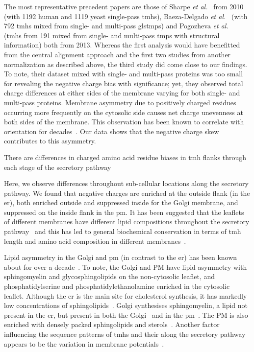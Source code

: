 The most representative precedent papers are those of Sharpe \textit{et al.}~\cite{Sharpe2010} from 2010 (with 1192 human and 1119 yeast single-pass \gls{tmh}s), Baeza-Delgado \textit{et al.}~\cite{Baeza-Delgado2013} (with 792 \gls{tmh}s mixed from single- and multi-pass gls{tmp}s) and Pogozheva \textit{et al.}~\cite{Pogozheva2013} (\gls{tmh}s from 191 mixed from single- and multi-pass \gls{tmp}s with structural information) both from 2013. Whereas the first analysis would have benefitted from the central alignment approach and the first two studies from another normalization as described above, the third study did come close to our findings. To note, their dataset mixed with single- and multi-pass proteins was too small for revealing the negative charge bias with significance; yet, they observed total charge differences at either sides of the membrane varying for both single- and multi-pass proteins. Membrane asymmetry due to positively charged residues occurring more frequently on the cytosolic side causes net charge unevenness at both sides of the membrane. This observation has been known to correlate with orientation for decades~\cite{VonHeijne1989, Baeza-Delgado2013, Meindl-Beinker2006}. Our data shows that the negative charge skew contributes to this asymmetry.

There are differences in charged amino acid residue biases in \gls{tmh} flanks through each stage of the secretory pathway

Here, we observe differences throughout sub-cellular locations along the secretory pathway. We found that negative charges are enriched at the outside flank (in the \gls{er}), both enriched outside and suppressed inside for the Golgi membrane, and suppressed on the inside flank in the \gls{pm}. It has been suggested that the leaflets of different membranes have different lipid compositions throughout the secretory pathway~\cite{VanMeer2008} and this has led to general biochemical conservation in terms of \gls{tmh} length and amino acid composition in different membranes~\cite{Sharpe2010, Pogozheva2013}.

Lipid asymmetry in the Golgi and \gls{pm} (in contrast to the \gls{er}) has been known about for over a decade~\cite{Daleke2007, Devaux2004}. To note, the Golgi and PM have lipid asymmetry with sphingomyelin and glycosphingolipids on the non-cytosolic leaflet, and phosphatidylserine and phosphatidylethanolamine enriched in the cytosolic leaflet. Although the \gls{er} is the main site for cholesterol synthesis, it has markedly low concentrations of sphingolipids~\cite{Bell1981}. Golgi synthesises sphingomyelin, a lipid not present in the \gls{er}, but present in both the Golgi~\cite{Futerman2005} and in the \gls{pm}~\cite{Li2007, Tafesse2007}. The PM is also enriched with densely packed sphingolipids and sterols~\cite{Paolo2006}. Another factor influencing the sequence patterns of \gls{tmh}s and their along the secretory pathway appears to be the variation in membrane potentials~\cite{Qin2011, Worley1994, Schapiro2000}.

